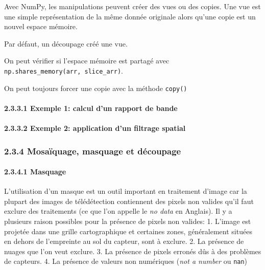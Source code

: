 Avec NumPy, les manipulations peuvent créer des vues ou des copies. Une
vue est une simple représentation de la même donnée originale alors
qu'une copie est un nouvel espace mémoire.

Par défaut, un découpage créé une vue.

On peut vérifier si l'espace mémoire est partagé avec
\texttt{np.shares\_memory(arr,\ slice\_arr)}.

On peut toujours forcer une copie avec la méthode \texttt{copy()}

\paragraph{\texorpdfstring{{2.3.3.1} Exemple 1: calcul d'un rapport de
bande}{2.3.3.1 Exemple 1: calcul d'un rapport de bande}}\label{exemple-1-calcul-dun-rapport-de-bande}

\paragraph{\texorpdfstring{{2.3.3.2} Exemple 2: application d'un
filtrage
spatial}{2.3.3.2 Exemple 2: application d'un filtrage spatial}}\label{exemple-2-application-dun-filtrage-spatial}

\subsubsection{\texorpdfstring{{2.3.4} Mosaïquage, masquage et
découpage}{2.3.4 Mosaïquage, masquage et découpage}}\label{mosauxefquage-masquage-et-duxe9coupage}

\paragraph{\texorpdfstring{{2.3.4.1}
Masquage}{2.3.4.1 Masquage}}\label{masquage}

L'utilisation d'un masque est un outil important en traitement d'image
car la plupart des images de télédétection contiennent des pixels non
valides qu'il faut exclure des traitements (ce que l'on appelle le
\emph{no data} en Anglais). Il y a plusieurs raison possibles pour la
présence de pixels non valides: 1. L'image est projetée dans une grille
cartographique et certaines zones, généralement situées en dehors de
l'empreinte au sol du capteur, sont à exclure. 2. La présence de nuages
que l'on veut exclure. 3. La présence de pixels erronés dûs à des
problèmes de capteurs. 4. La présence de valeurs non numériques
(\emph{not a number} ou \texttt{nan})

